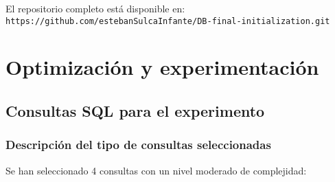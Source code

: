 \documentclass[12pt,a4paper]{article}
\begin{document}
El repositorio completo está disponible en: \texttt{https://github.com/estebanSulcaInfante/DB-final-initialization.git}

\section{Optimización y experimentación}
\subsection{Consultas SQL para el experimento}
\subsubsection{Descripción del tipo de consultas seleccionadas}
Se han seleccionado 4 consultas con un nivel moderado de complejidad:
\end{document}
